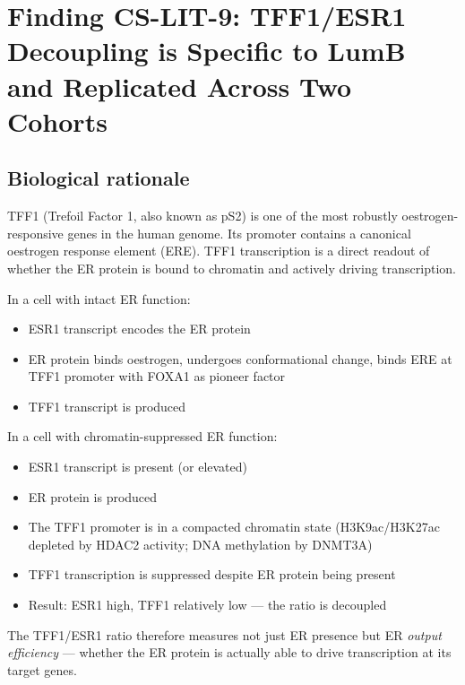 \documentclass[12pt, a4paper]{article}
\begin{document}
\section{Finding CS-LIT-9: TFF1/ESR1 Decoupling is
Specific to LumB and Replicated Across Two Cohorts}

\subsection{Biological rationale}

TFF1 (Trefoil Factor 1, also known as pS2) is one of
the most robustly oestrogen-responsive genes in the
human genome. Its promoter contains a canonical
oestrogen response element (ERE). TFF1 transcription
is a direct readout of whether the ER protein is
bound to chromatin and actively driving transcription.

\noindent
In a cell with intact ER function:
\begin{itemize}[noitemsep]
  \item ESR1 transcript encodes the ER protein
  \item ER protein binds oestrogen, undergoes
        conformational change, binds ERE at TFF1
        promoter with FOXA1 as pioneer factor
  \item TFF1 transcript is produced
\end{itemize}

\noindent
In a cell with chromatin-suppressed ER function:
\begin{itemize}[noitemsep]
  \item ESR1 transcript is present (or elevated)
  \item ER protein is produced
  \item The TFF1 promoter is in a compacted chromatin
        state (H3K9ac/H3K27ac depleted by HDAC2
        activity; DNA methylation by DNMT3A)
  \item TFF1 transcription is suppressed despite
        ER protein being present
  \item Result: ESR1 high, TFF1 relatively low ---
        the ratio is decoupled
\end{itemize}

\noindent
The TFF1/ESR1 ratio therefore measures not just ER
presence but ER \textit{output efficiency} --- whether
the ER protein is actually able to drive transcription
at its target genes.
\end{document}
